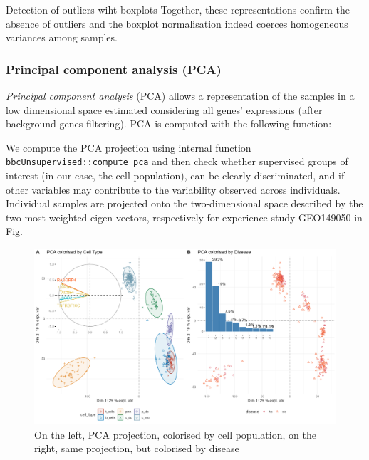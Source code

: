\begin{conclusion}{Detection of outliers wiht boxplots}
Together, these representations confirm the absence of outliers and the boxplot normalisation indeed coerces homogeneous variances among samples.

\end{conclusion}


\subsubsection{Principal component analysis (PCA)} 
\label{subsec:PCA}

\emph{Principal component analysis} (PCA) allows a representation of the samples in a low dimensional space estimated considering all genes' expressions (after background genes filtering). PCA is computed with the following function:

We compute the PCA projection using internal function \texttt{bbcUnsupervised::compute\_pca}
and then check whether supervised groups of interest (in our case, the cell population), can be clearly discriminated, and if other variables may contribute to the variability observed across individuals. Individual samples are projected onto the two-dimensional space described by the two most weighted eigen vectors, respectively for experience study GEO149050 in Fig. 

\begin{figure}

{\centering \includegraphics[width=0.9\linewidth]{./figures/pca_gse149050} 

}

\caption{On the left, PCA projection, colorised by cell population, on the right, same projection, but colorised by disease}\label{fig:pca-graph1}
\end{figure}

